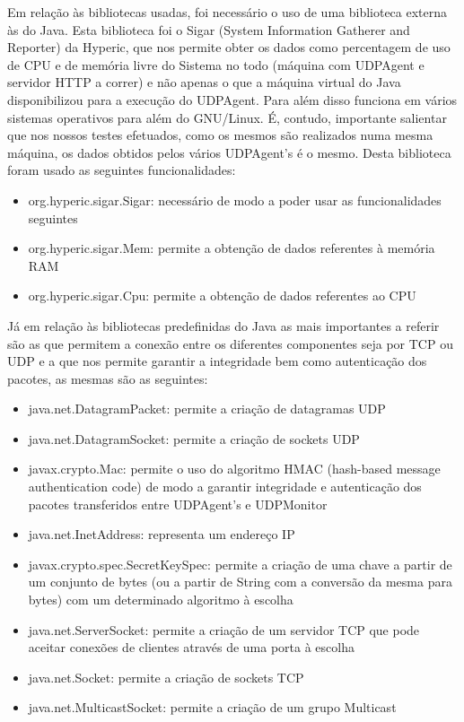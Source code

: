 \documentclass{article}
\begin{document}
Em relação às bibliotecas usadas, foi necessário o uso de uma biblioteca externa às do Java. Esta biblioteca foi o Sigar (System Information Gatherer and Reporter) da Hyperic, que nos permite obter os dados como percentagem de uso de CPU e de memória livre do Sistema no todo (máquina com UDPAgent e servidor HTTP a correr) e não apenas o que a máquina virtual do Java disponibilizou para a execução do UDPAgent. Para além disso funciona em vários sistemas operativos para além do GNU/Linux. É, contudo, importante salientar que nos nossos testes efetuados, como os mesmos são realizados numa mesma máquina, os dados obtidos pelos vários UDPAgent's é o mesmo. Desta biblioteca foram usado as seguintes funcionalidades:
\begin{itemize}
	\item org.hyperic.sigar.Sigar: necessário de modo a poder usar as funcionalidades seguintes
	\item org.hyperic.sigar.Mem: permite a obtenção de dados referentes à memória RAM
	\item org.hyperic.sigar.Cpu: permite a obtenção de dados referentes ao CPU
\end{itemize}
Já em relação às bibliotecas predefinidas do Java as mais importantes a referir são as que permitem a conexão entre os diferentes componentes seja por TCP ou UDP e a que nos permite garantir a integridade bem como autenticação dos pacotes, as mesmas são as seguintes:
\begin{itemize}
	\item java.net.DatagramPacket: permite a criação de datagramas UDP
  	\item java.net.DatagramSocket: permite a criação de sockets UDP
    \item javax.crypto.Mac: permite o uso do algoritmo HMAC (hash-based message authentication code) de modo a garantir integridade e autenticação dos pacotes transferidos entre UDPAgent's e UDPMonitor
    \item java.net.InetAddress: representa um endereço IP
    \item javax.crypto.spec.SecretKeySpec: permite a criação de uma chave a partir de um conjunto de bytes (ou a partir de String com a conversão da mesma para bytes) com um determinado algoritmo à escolha
    \item java.net.ServerSocket: permite a criação de um servidor TCP que pode aceitar conexões de clientes através de uma porta à escolha
	\item java.net.Socket: permite a criação de sockets TCP
    \item java.net.MulticastSocket: permite a criação de um grupo Multicast
\end{itemize}
\end{document}

